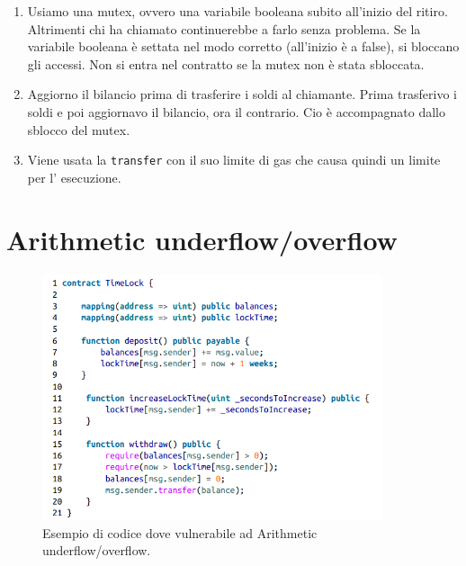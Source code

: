 \begin{enumerate}
      \item Usiamo una mutex, ovvero una variabile booleana subito all'inizio
            del ritiro. Altrimenti chi ha chiamato continuerebbe a farlo senza problema.
            Se la variabile booleana è
            settata nel modo corretto (all'inizio è a false), si bloccano gli accessi.
            Non si entra nel
            contratto se la mutex non è stata sbloccata.
      \item Aggiorno il bilancio prima di trasferire i soldi al chiamante.
            Prima trasferivo i soldi e
            poi aggiornavo il bilancio, ora il contrario.
            Cio è accompagnato dallo sblocco del
            mutex.
      \item Viene usata la \verb|transfer| con il suo limite di gas che causa
            quindi un limite per l'
            esecuzione.
\end{enumerate}

\section{Arithmetic underflow/overflow}

\begin{figure}[H]
      \centering
      \includegraphics[width=10cm, keepaspectratio]{capitoli/ethereum/imgs/aritmetic.png}
      \caption{Esempio di codice dove vulnerabile ad Arithmetic underflow/overflow.}
\end{figure}

